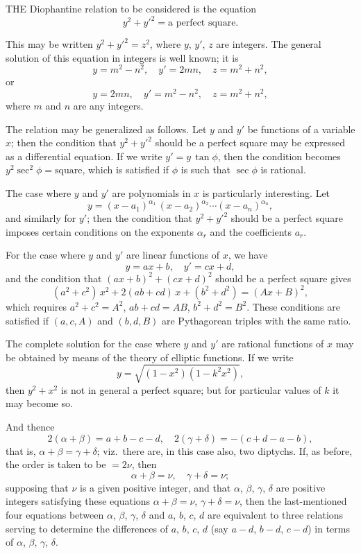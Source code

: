 \documentclass[12pt,a4paper]{article}
\theoremstyle{plain}
\begin{document}
\medskip\noindent
THE Diophantine relation to be considered is the equation
\[
y^{2} + y'^{2} = \text{a perfect square}.
\]

This may be written $y^{2} + y'^{2} = z^{2}$, where $y$, $y'$, $z$ are integers. The general solution of this equation in integers is well known; it is
\[
y = m^{2} - n^{2}, \quad y' = 2mn, \quad z = m^{2} + n^{2},
\]
or
\[
y = 2mn, \quad y' = m^{2} - n^{2}, \quad z = m^{2} + n^{2},
\]
where $m$ and $n$ are any integers.

\medskip\noindent
The relation may be generalized as follows. Let $y$ and $y'$ be functions of a variable $x$; then the condition that $y^{2} + y'^{2}$ should be a perfect square may be expressed as a differential equation. If we write $y' = y\,\tan\phi$, then the condition becomes $y^{2}\sec^{2}\phi = \text{square}$, which is satisfied if $\phi$ is such that $\sec\phi$ is rational.

\medskip\noindent
The case where $y$ and $y'$ are polynomials in $x$ is particularly interesting. Let
\[
y = (x - a_{1})^{\alpha_{1}}\,(x - a_{2})^{\alpha_{2}} \cdots (x - a_{n})^{\alpha_{n}},
\]
and similarly for $y'$; then the condition that $y^{2} + y'^{2}$ should be a perfect square imposes certain conditions on the exponents $\alpha_{r}$ and the coefficients $a_{r}$.

\medskip\noindent
For the case where $y$ and $y'$ are linear functions of $x$, we have
\[
y = ax + b, \quad y' = cx + d,
\]
and the condition that $(ax+b)^{2} + (cx+d)^{2}$ should be a perfect square gives
\[
(a^{2} + c^{2})\,x^{2} + 2(ab + cd)\,x + (b^{2} + d^{2}) = (Ax + B)^{2},
\]
which requires $a^{2} + c^{2} = A^{2}$, $ab + cd = AB$, $b^{2} + d^{2} = B^{2}$. These conditions are satisfied if $(a, c, A)$ and $(b, d, B)$ are Pythagorean triples with the same ratio.

\medskip\noindent
The complete solution for the case where $y$ and $y'$ are rational functions of $x$ may be obtained by means of the theory of elliptic functions. If we write
\[
y = \sqrt{(1 - x^{2})(1 - k^{2}x^{2})},
\]
then $y^{2} + x^{2}$ is not in general a perfect square; but for particular values of $k$ it may become so.

\medskip\noindent
And thence
\[
2(\alpha + \beta) = a + b - c - d, \quad 2(\gamma + \delta) = -(c + d - a - b),
\]
that is, $\alpha + \beta = \gamma + \delta$; viz.\ there are, in this case also, two diptychs. If, as before, the order is taken to be $= 2\nu$, then
\[
\alpha + \beta = \nu, \quad \gamma + \delta = \nu;
\]
supposing that $\nu$ is a given positive integer, and that $\alpha$, $\beta$, $\gamma$, $\delta$ are positive integers satisfying these equations $\alpha + \beta = \nu$, $\gamma + \delta = \nu$, then the last-mentioned four equations between $\alpha$, $\beta$, $\gamma$, $\delta$ and $a$, $b$, $c$, $d$ are equivalent to three relations serving to determine the differences of $a$, $b$, $c$, $d$ (say $a - d$, $b - d$, $c - d$) in terms of $\alpha$, $\beta$, $\gamma$, $\delta$.
\end{document}
